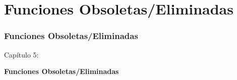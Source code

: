 %

\section{Funciones Obsoletas/Eliminadas}
\begin{frame}[fragile]
	\frametitle{Funciones Obsoletas/Eliminadas}

	\begin{center}\huge{Capítulo 5:}\end{center}
	\begin{center}\huge{\color{typo3darkgrey}\textbf{Funciones Obsoletas/Eliminadas}}\end{center}

\end{frame}

